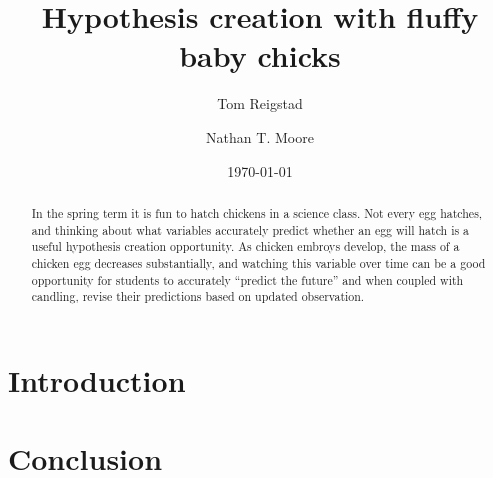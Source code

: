 \documentclass[prb,preprint]{revtex4-2}
\begin{document}
\title{Hypothesis creation with fluffy baby chicks} 

\author{Tom Reigstad}

\author{Nathan T. Moore}

\date{\today}

\begin{abstract}
In the spring term it is fun to hatch chickens in a science class. 
Not every egg hatches, and thinking about what variables accurately predict whether an egg will hatch is a useful hypothesis creation opportunity.
As chicken embroys develop, the mass of a chicken egg decreases substantially, and watching this variable over time can be a good opportunity for students to accurately ``predict the future'' and when coupled with candling, revise their predictions based on updated observation. 
\end{abstract}
\maketitle

\section{Introduction}



\section{Conclusion}

\begin{acknowledgments}

\end{acknowledgments}
\end{document}
